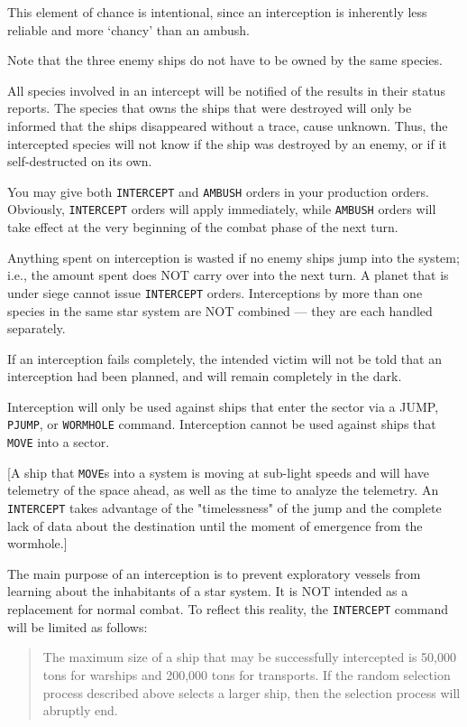 \documentclass[10pt,titlepage]{article}
\begin{document}
This element of chance is intentional, since an interception is inherently less
reliable and more `chancy' than an ambush.

Note that the three enemy ships do not have to be owned by the same species.

All species involved in an intercept will be notified of the results in their
status reports.  The species that owns the ships that were destroyed will only
be informed that the ships disappeared without a trace, cause unknown.  Thus,
the intercepted species will not know if the ship was destroyed by an enemy,
or if it self-destructed on its own.

You may give both \texttt{INTERCEPT} and \texttt{AMBUSH} orders in your production orders. 
Obviously, \texttt{INTERCEPT} orders will apply immediately, while \texttt{AMBUSH} orders will
take effect at the very beginning of the combat phase of the next turn.

Anything spent on interception is wasted if no enemy ships jump into the
system; i.e., the amount spent does NOT carry over into the next turn.  A
planet that is under siege cannot issue \texttt{INTERCEPT} orders.  Interceptions by
more than one species in the same star system are NOT combined --- they are
each handled separately.

If an interception fails completely, the intended victim will not be told that
an interception had been planned, and will remain completely in the dark.

Interception will only be used against ships that enter the sector via a JUMP,
\texttt{PJUMP}, or \texttt{WORMHOLE} command.  Interception cannot be used against ships that
\texttt{MOVE} into a sector.

[A ship that \texttt{MOVE}s into a system is moving at sub-light speeds and will have
telemetry of the space ahead, as well as the time to analyze the telemetry.
An \texttt{INTERCEPT} takes advantage of the "timelessness" of the jump and the complete
lack of data about the destination until the moment of emergence from the
wormhole.]

The main purpose of an interception is to prevent exploratory vessels from
learning about the inhabitants of a star system.  It is NOT intended as
a replacement for normal combat.  To reflect this reality, the \texttt{INTERCEPT}
command will be limited as follows:

\begin{quotation}
	The maximum size of a ship that may be successfully intercepted
	is 50,000 tons for warships and 200,000 tons for transports.  If
	the random selection process described above selects a larger
	ship, then the selection process will abruptly end.\end{quotation} 
\end{document}
